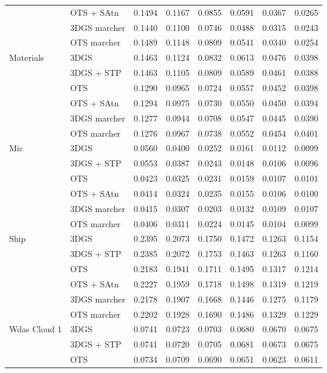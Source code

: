 \begin{longtable}[H]{llrrrrrr}
 & OTS + SAtn & 0.1494 & 0.1167 & 0.0855 & 0.0591 & 0.0367 & 0.0265 \\
 & 3DGS marcher & 0.1440 & 0.1100 & 0.0746 & 0.0488 & 0.0315 & 0.0243 \\
 & OTS marcher & 0.1489 & 0.1148 & 0.0809 & 0.0541 & 0.0340 & 0.0254 \\
Materials & 3DGS & 0.1463 & 0.1124 & 0.0832 & 0.0613 & 0.0476 & 0.0398 \\
 & 3DGS + STP & 0.1463 & 0.1105 & 0.0809 & 0.0589 & 0.0461 & 0.0388 \\
 & OTS & 0.1290 & 0.0965 & 0.0724 & 0.0557 & 0.0452 & 0.0398 \\
 & OTS + SAtn & 0.1294 & 0.0975 & 0.0730 & 0.0550 & 0.0450 & 0.0394 \\
 & 3DGS marcher & 0.1277 & 0.0944 & 0.0708 & 0.0547 & 0.0445 & 0.0390 \\
 & OTS marcher & 0.1276 & 0.0967 & 0.0738 & 0.0552 & 0.0454 & 0.0401 \\
Mic & 3DGS & 0.0560 & 0.0400 & 0.0252 & 0.0161 & 0.0112 & 0.0099 \\
 & 3DGS + STP & 0.0553 & 0.0387 & 0.0243 & 0.0148 & 0.0106 & 0.0096 \\
 & OTS & 0.0423 & 0.0325 & 0.0231 & 0.0159 & 0.0107 & 0.0101 \\
 & OTS + SAtn & 0.0414 & 0.0324 & 0.0235 & 0.0155 & 0.0106 & 0.0100 \\
 & 3DGS marcher & 0.0415 & 0.0307 & 0.0203 & 0.0132 & 0.0109 & 0.0107 \\
 & OTS marcher & 0.0406 & 0.0311 & 0.0224 & 0.0145 & 0.0104 & 0.0099 \\
Ship & 3DGS & 0.2395 & 0.2073 & 0.1750 & 0.1472 & 0.1263 & 0.1154 \\
 & 3DGS + STP & 0.2385 & 0.2072 & 0.1753 & 0.1463 & 0.1263 & 0.1160 \\
 & OTS & 0.2183 & 0.1941 & 0.1711 & 0.1495 & 0.1317 & 0.1214 \\
 & OTS + SAtn & 0.2227 & 0.1959 & 0.1718 & 0.1498 & 0.1319 & 0.1219 \\
 & 3DGS marcher & 0.2178 & 0.1907 & 0.1668 & 0.1446 & 0.1275 & 0.1179 \\
 & OTS marcher & 0.2202 & 0.1928 & 0.1690 & 0.1486 & 0.1329 & 0.1229 \\
Wdas Cloud 1 & 3DGS & 0.0741 & 0.0723 & 0.0703 & 0.0680 & 0.0670 & 0.0675 \\
 & 3DGS + STP & 0.0741 & 0.0720 & 0.0705 & 0.0681 & 0.0673 & 0.0675 \\
 & OTS & 0.0734 & 0.0709 & 0.0690 & 0.0651 & 0.0623 & 0.0611 \\

\end{longtable}
